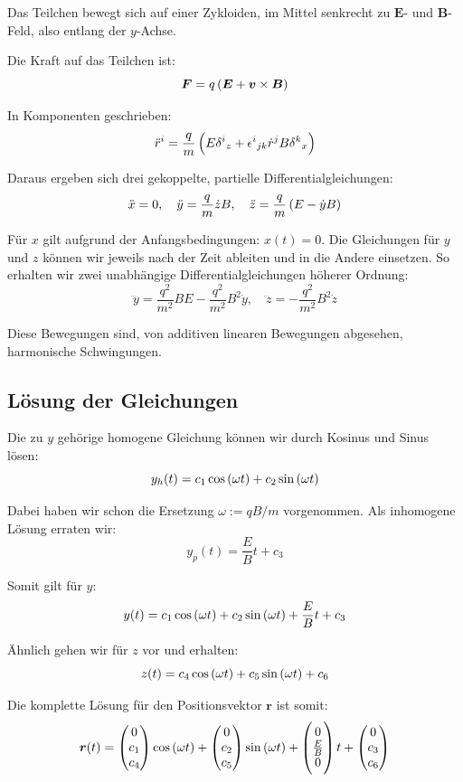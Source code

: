 \documentclass[11pt, ngerman, fleqn]{article}
\renewcommand{\vec}[1]{\boldsymbol{#1}}
\begin{document}
Das Teilchen bewegt sich auf einer Zykloiden, im Mittel senkrecht zu $\vec E$-
und $\vec B$-Feld, also entlang der $y$-Achse.

Die Kraft auf das Teilchen ist:
\[
	\vec F = q \del{\vec E + \vec v \times \vec B}
\]

In Komponenten geschrieben:
\[
	\ddot r^i = \frac qm \del{E \delta^i{}_z + \epsilon^i{}_{jk} \dot r^j B \delta^k{}_x}
\]

Daraus ergeben sich drei gekoppelte, partielle Differentialgleichungen:
\[
	\ddot x = 0
	,\quad
	\ddot y = \frac qm \dot z B
	,\quad
	\ddot z = \frac qm \del{E - \dot y B}
\]

Für $x$ gilt aufgrund der Anfangsbedingungen: $x(t) = 0$. Die Gleichungen für
$y$ und $z$ können wir jeweils nach der Zeit ableiten und in die Andere
einsetzen. So erhalten wir zwei unabhängige Differentialgleichungen höherer
Ordnung:
\[
	\dddot y = \frac{q^2}{m^2} B E - \frac{q^2}{m^2} B^2 \dot y
	,\quad
	\dddot z = - \frac{q^2}{m^2} B^2 \dot z
\]

Diese Bewegungen sind, von additiven linearen Bewegungen abgesehen, harmonische
Schwingungen.

\subsection{Lösung der Gleichungen}

Die zu $y$ gehörige homogene Gleichung können wir durch Kosinus und Sinus
lösen:
\[
	y_h(t) = c_1 \cos\del{\omega t} + c_2 \sin\del{\omega t}
\]

Dabei haben wir schon die Ersetzung $\omega := q B / m$ vorgenommen. Als
inhomogene Lösung erraten wir:
\[
	y_p(t) = \frac EB t + c_3
\]

Somit gilt für $y$:
\[
	y(t) = c_1 \cos\del{\omega t} + c_2 \sin\del{\omega t} + \frac EB t + c_3
\]

Ähnlich gehen wir für $z$ vor und erhalten:
\[
	z(t) = c_4 \cos\del{\omega t} + c_5 \sin\del{\omega t} + c_6
\]

Die komplette Lösung für den Positionsvektor $\vec r$ ist somit:
\[
	\vec r(t) = \begin{pmatrix}
		0 \\
		c_1 \\
		c_4 \\
	\end{pmatrix} \cos\del{\omega t}
	+
	\begin{pmatrix}
		0 \\
		c_2 \\
		c_5 \\
	\end{pmatrix} \sin\del{\omega t}
	+
	\begin{pmatrix}
		0 \\
		\frac EB \\
		0 \\
	\end{pmatrix} t
	+
	\begin{pmatrix}
		0 \\
		c_3 \\
		c_6 \\
	\end{pmatrix}
\]
\end{document}
